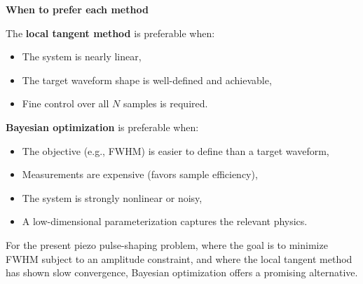 \documentclass[11pt]{article}
\begin{document}
\vspace{1em}
\begin{center}
\textbf{When to prefer each method}
\end{center}

The \textbf{local tangent method} is preferable when:
\begin{itemize}[nosep]
    \item The system is nearly linear,
    \item The target waveform shape is well-defined and achievable,
    \item Fine control over all $N$ samples is required.
\end{itemize}

\textbf{Bayesian optimization} is preferable when:
\begin{itemize}[nosep]
    \item The objective (e.g., FWHM) is easier to define than a target waveform,
    \item Measurements are expensive (favors sample efficiency),
    \item The system is strongly nonlinear or noisy,
    \item A low-dimensional parameterization captures the relevant physics.
\end{itemize}

For the present piezo pulse-shaping problem, where the goal is to minimize FWHM subject to an amplitude constraint, and where the local tangent method has shown slow convergence, Bayesian optimization offers a promising alternative.
\end{document}
